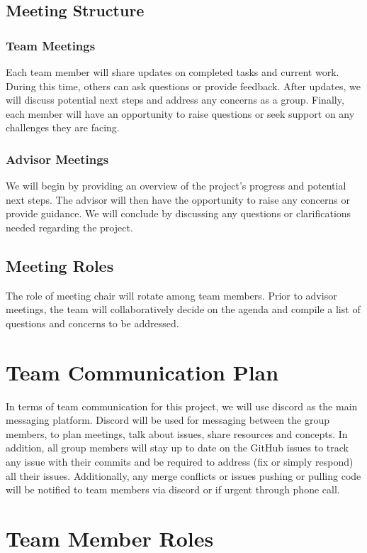 \documentclass{article}
\begin{document}
\subsection{Meeting Structure}

\subsubsection{Team Meetings}
Each team member will share updates on completed tasks and current work. During this time, others can ask questions or provide feedback. After updates, we will discuss potential next steps and address any concerns as a group. Finally, each member will have an opportunity to raise questions or seek support on any challenges they are facing.

\subsubsection{Advisor Meetings}
We will begin by providing an overview of the project’s progress and potential next steps. The advisor will then have the opportunity to raise any concerns or provide guidance. We will conclude by discussing any questions or clarifications needed regarding the project.

\subsection{Meeting Roles}
The role of meeting chair will rotate among team members. Prior to advisor meetings, the team will collaboratively decide on the agenda and compile a list of questions and concerns to be addressed.

\section{Team Communication Plan}
In terms of team communication for this project, we will use discord as the main messaging platform. Discord will be used for messaging between the group members, to plan meetings, talk about issues, share resources and concepts. In addition, all group members will stay up to date on the GitHub issues to track any issue with their commits and be required to address (fix or simply respond) all their issues. Additionally, any merge conflicts or issues pushing or pulling code will be notified to team members via discord or if urgent through phone call.

\section{Team Member Roles}
\end{document}

